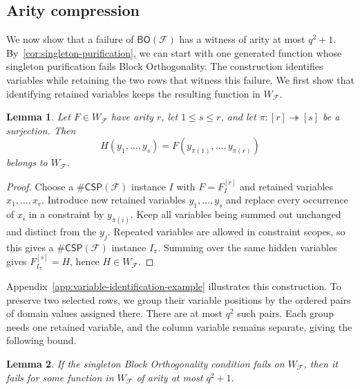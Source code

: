 \documentclass[11pt,letterpaper,onecolumn]{article}
\theoremstyle{plain}
\newtheorem{lemma}[lemma]{Lemma}
\theoremstyle{definition}
\theoremstyle{remark}
\newcommand{\cF}{\mathcal F}
\newcommand{\BO}{\mathsf{BO}}
\newcommand{\CSP}[1]{\mathsf{\#CSP}(#1)}
\begin{document}
\subsection{Arity compression}

We now show that a failure of $\BO(\cF)$ has a witness of arity at most
$q^2+1$.  By~\cref{cor:singleton-purification}, we can start with one
generated function whose singleton purification fails Block Orthogonality.
The construction identifies variables while retaining the two rows
that witness this failure.  We first show that identifying retained
variables keeps the resulting function in $W_{\cF}$.

\begin{lemma}
\label{lem:diagonal-minors}
Let $F\in W_{\cF}$ have arity $r$, let $1\le s\le r$, and let
$\pi:[r]\twoheadrightarrow[s]$ be a surjection.  Then
\[
  H(y_1,\ldots,y_s)
  =F(y_{\pi(1)},\ldots,y_{\pi(r)})
\]
belongs to $W_{\cF}$.
\end{lemma}

\begin{proof}
Choose a $\CSP{\cF}$ instance $I$ with $F=F_I^{[r]}$ and retained
variables $x_1,\ldots,x_r$.
Introduce new retained variables $y_1,\ldots,y_s$ and replace every
occurrence of $x_i$ in a constraint by $y_{\pi(i)}$.
Keep all variables being summed out unchanged and distinct from the
$y_j$.  Repeated variables are allowed in constraint scopes, so this
gives a $\CSP{\cF}$ instance $I_\pi$.
Summing over the same hidden variables gives $F_{I_\pi}^{[s]}=H$, hence
$H\in W_{\cF}$.
\end{proof}

Appendix~\ref{app:variable-identification-example} illustrates this
construction.
To preserve two selected rows, we group their variable positions by the
ordered pairs of domain values assigned there.  There are at most $q^2$
such pairs.  Each group needs one retained variable, and the column
variable remains separate, giving the following bound.

\begin{lemma}
\label{lem:bo-arity-bound}
If the singleton Block Orthogonality condition fails on $W_{\cF}$,
then it fails for some function in $W_{\cF}$ of arity at most $q^2+1$.
\end{lemma}
\end{document}
